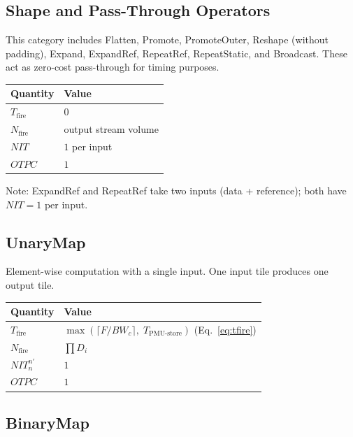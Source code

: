 \documentclass[10pt]{article}
\begin{document}
\subsection{Shape and Pass-Through Operators}

This category includes Flatten, Promote, PromoteOuter, Reshape (without padding), Expand, ExpandRef, RepeatRef, RepeatStatic, and Broadcast. These act as zero-cost pass-through for timing purposes.

\begin{table}[h]
\centering
\begin{tabular}{@{}ll@{}}
\toprule
\textbf{Quantity} & \textbf{Value} \\
\midrule
$T_{\text{fire}}$ & $0$ \\
$N_{\text{fire}}$ & output stream volume \\
$\mathit{NIT}$ & $1$ per input \\
$\mathit{OTPC}$ & $1$ \\
\bottomrule
\end{tabular}
\end{table}

Note: ExpandRef and RepeatRef take two inputs (data + reference); both have $\mathit{NIT} = 1$ per input.

\subsection{UnaryMap}

Element-wise computation with a single input. One input tile produces one output tile.

\begin{table}[h]
\centering
\begin{tabular}{@{}ll@{}}
\toprule
\textbf{Quantity} & \textbf{Value} \\
\midrule
$T_{\text{fire}}$ & $\max\!\left(\lceil F / \mathit{BW}_c\rceil,\; T_{\text{PMU-store}}\right)$ \quad (Eq.~\ref{eq:tfire}) \\[4pt]
$N_{\text{fire}}$ & $\prod D_i$ \\
$\mathit{NIT}^{n'}_n$ & $1$ \\
$\mathit{OTPC}$ & $1$ \\
\bottomrule
\end{tabular}
\end{table}

\subsection{BinaryMap}
\end{document}
